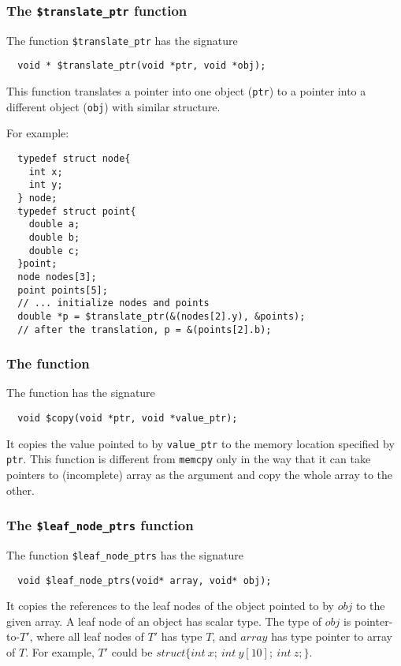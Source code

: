 \subsubsection{The \texttt{\$translate\_ptr} function}
The function \texttt{\$translate\_ptr} has the signature
\begin{verbatim}
  void * $translate_ptr(void *ptr, void *obj);
\end{verbatim}

This function translates a pointer into one object (\texttt{ptr}) to a pointer into a different object (\texttt{obj}) with similar structure. 

For example:
\begin{verbatim}
  typedef struct node{
    int x;
    int y;
  } node;
  typedef struct point{
    double a;
    double b;
    double c;
  }point;
  node nodes[3];
  point points[5];
  // ... initialize nodes and points
  double *p = $translate_ptr(&(nodes[2].y), &points);
  // after the translation, p = &(points[2].b);
\end{verbatim}

\subsubsection{The \ccopy{} function}

The \ccopy{} function has the signature
\begin{verbatim}
  void $copy(void *ptr, void *value_ptr);
\end{verbatim}

It copies the value pointed to by \texttt{value\_ptr} to the memory 
location specified by \texttt{ptr}. This function is different from \texttt{memcpy} only in the way that
it can take pointers to (incomplete) array as the argument and copy the whole array to the other.

\subsubsection{The \texttt{\$leaf\_node\_ptrs} function}
The function \texttt{\$leaf\_node\_ptrs} has the signature
\begin{verbatim}
  void $leaf_node_ptrs(void* array, void* obj);
\end{verbatim}
It copies the references to the leaf nodes of the object pointed to by $obj$ 
to the given array. A leaf node of an object has scalar type. 
The type of $obj$ is pointer-to-$T'$, where all leaf nodes of $T'$ has type $T$, 
and $array$ has type pointer to array of $T$. For example, 
$T'$ could be $struct\{int~x;~int~y[10];~int~z;\}$.

